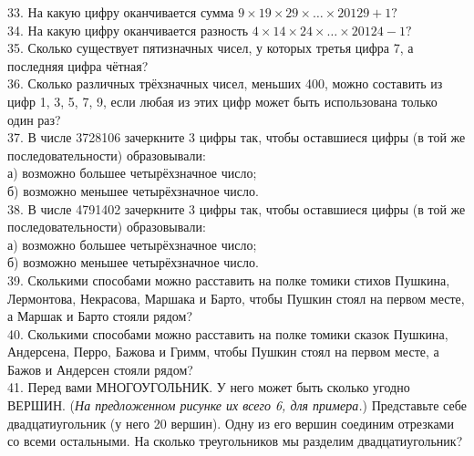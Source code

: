 \documentclass[12pt]{article}
\begin{document}
33. На какую цифру оканчивается сумма $9\times19\times29\times\ldots\times20129+1?$\\
34. На какую цифру оканчивается разность $4\times14\times24\times\ldots\times20124-1?$\\
35. Сколько существует пятизначных чисел, у которых третья цифра 7, а последняя цифра чётная?\\
36. Сколько различных трёхзначных чисел, меньших 400, можно составить из цифр 1, 3, 5, 7, 9, если любая из этих цифр может быть использована только один раз?\\
37. В числе 3728106 зачеркните 3 цифры так, чтобы оставшиеся цифры (в той же последовательности) образовывали:\\
а) возможно большее четырёхзначное число;\\
б) возможно меньшее четырёхзначное число.\\
38. В числе 4791402 зачеркните 3 цифры так, чтобы оставшиеся цифры (в той же последовательности) образовывали:\\
а) возможно большее четырёхзначное число;\\
б) возможно меньшее четырёхзначное число.\\
39. Сколькими способами можно расставить на полке томики стихов Пушкина, Лермонтова, Некрасова, Маршака и Барто, чтобы Пушкин стоял на первом месте, а Маршак и Барто стояли рядом?\\
40. Сколькими способами можно расставить на полке томики сказок Пушкина, Андерсена, Перро, Бажова и Гримм, чтобы Пушкин стоял на первом месте, а Бажов и Андерсен стояли рядом?\\
41. Перед вами МНОГОУГОЛЬНИК. У него может быть сколько угодно ВЕРШИН. ({\it На предложенном рисунке их всего 6, для примера.}) Представьте себе двадцатиугольник (у него 20 вершин). Одну из его вершин соединим отрезками со всеми остальными. На сколько треугольников мы разделим двадцатиугольник?
\begin{center}
\begin{figure}[ht!]
\end{figure}
\end{center}
\end{document}
